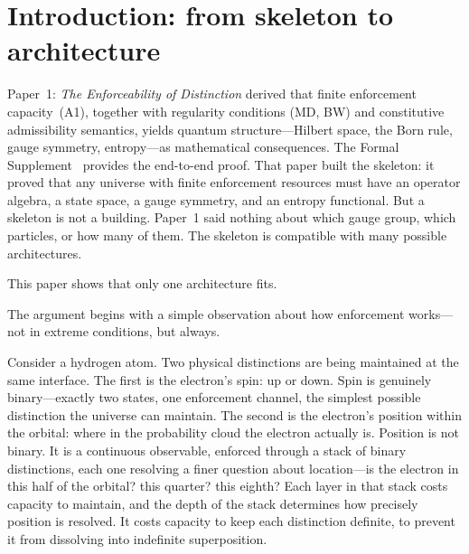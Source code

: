\documentclass[11pt]{article}
\begin{document}
\begin{abstract}
All results trace to named check functions in the codebase.  No free parameters are introduced; no physics is imported.  The correlation space now has rooms, and we can count them.
\end{abstract}

\tableofcontents
\newpage


\section{Introduction: from skeleton to architecture}
\label{sec:intro}

Paper~1: \emph{The Enforceability of Distinction} derived that finite enforcement capacity~(A1), together with regularity conditions (MD, BW) and constitutive admissibility semantics, yields quantum structure---Hilbert space, the Born rule, gauge symmetry, entropy---as mathematical consequences.  The Formal Supplement~\cite{BrookeSupplement} provides the end-to-end proof.  That paper built the skeleton: it proved that any universe with finite enforcement resources must have an operator algebra, a state space, a gauge symmetry, and an entropy functional.  But a skeleton is not a building.  Paper~1 said nothing about which gauge group, which particles, or how many of them.  The skeleton is compatible with many possible architectures.

This paper shows that only one architecture fits.

The argument begins with a simple observation about how enforcement works---not in extreme conditions, but always.

Consider a hydrogen atom.  Two physical distinctions are being maintained at the same interface.  The first is the electron's spin: up or down.  Spin is genuinely binary---exactly two states, one enforcement channel, the simplest possible distinction the universe can maintain.  The second is the electron's position within the orbital: where in the probability cloud the electron actually is.  Position is not binary.  It is a continuous observable, enforced through a stack of binary distinctions, each one resolving a finer question about location---is the electron in this half of the orbital? this quarter? this eighth?  Each layer in that stack costs capacity to maintain, and the depth of the stack determines how precisely position is resolved.  It costs capacity to keep each distinction definite, to prevent it from dissolving into indefinite superposition.
\end{document}
